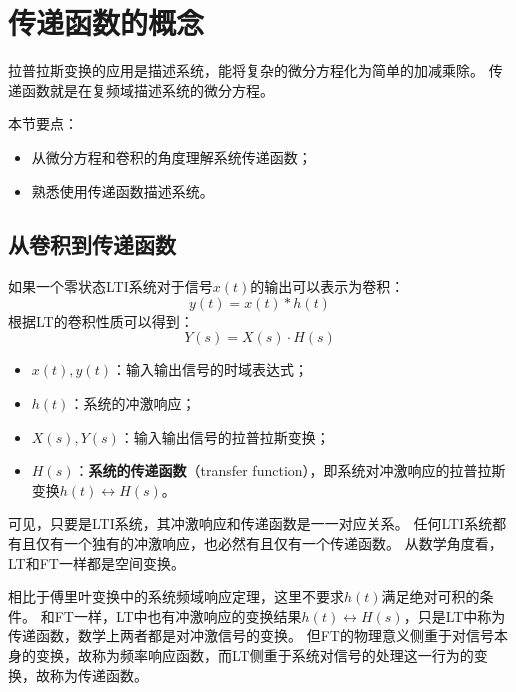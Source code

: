 \section{传递函数的概念}

拉普拉斯变换的应用是描述系统，能将复杂的微分方程化为简单的加减乘除。
传递函数就是在复频域描述系统的微分方程。

本节要点：
\begin{itemize}
    \item 从微分方程和卷积的角度理解系统传递函数；
    \item 熟悉使用传递函数描述系统。
\end{itemize}

\subsection{从卷积到传递函数}

\begin{definition}[传递函数]
如果一个零状态LTI系统对于信号$x\left( t \right) $的输出可以表示为卷积：
\[
y\left( t \right) =x\left( t \right) \ast h\left( t \right)
\]
根据LT的卷积性质可以得到：
\[
Y\left( s \right) =X\left( s \right) \cdot H\left( s \right)
\]
\begin{itemize}
    \item $x\left( t \right) ,y\left( t \right) $：输入输出信号的时域表达式；
    \item $h\left( t \right) $：系统的冲激响应；
    \item $X\left( s \right) ,Y\left( s \right) $：输入输出信号的拉普拉斯变换；
    \item $H\left( s \right) $：{\bf 系统的传递函数}（transfer function），即系统对冲激响应的拉普拉斯变换$h\left( t \right) \leftrightarrow H\left( s \right) $。
\end{itemize}
\end{definition}

可见，只要是LTI系统，其冲激响应和传递函数是一一对应关系。
任何LTI系统都有且仅有一个独有的冲激响应，也必然有且仅有一个传递函数。
从数学角度看，LT和FT一样都是空间变换。

相比于傅里叶变换中的系统频域响应定理，这里不要求$h\left( t \right) $满足绝对可积的条件。
和FT一样，LT中也有冲激响应的变换结果$h\left( t \right) \leftrightarrow H\left( s \right) $，只是LT中称为传递函数，数学上两者都是对冲激信号的变换。
但FT的物理意义侧重于对信号本身的变换，故称为频率响应函数，而LT侧重于系统对信号的处理这一行为的变换，故称为传递函数。

